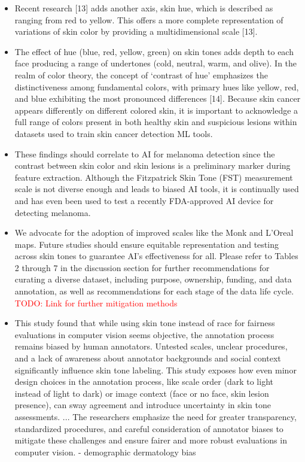 \documentclass[12pt, a4paper, oneside]{book}   	%
\renewcommand{\todo}[1]{\textcolor{red}{TODO: #1}}
\newif\ifrawcitationactive
\newcommand{\rawcitationend}{
	\color{black}\rawcitationactivefalse
}
\begin{document}
\begin{itemize}
			\item Recent research [13] adds another axis, skin hue, which is described as ranging from red to yellow. This offers a more complete representation of variations of skin color by providing a multidimensional scale [13]. \autocite{Montoya_2025}
			\item The effect of hue (blue, red, yellow, green) on skin tones adds depth to each face producing a range of undertones (cold, neutral, warm, and olive). In the realm of color theory, the concept of ‘contrast of hue’ emphasizes the distinctiveness among fundamental colors, with primary hues like yellow, red, and blue exhibiting the most pronounced differences [14]. Because skin cancer appears differently on different colored skin, it is important to acknowledge a full range of colors present in both healthy skin and suspicious lesions within datasets used to train skin cancer detection ML tools. \autocite{Montoya_2025}
			\item These findings should correlate to AI for melanoma detection since the contrast between skin color and skin lesions is a preliminary marker during feature extraction. Although the Fitzpatrick Skin Tone (FST) measurement scale is not diverse enough and leads to biased AI tools, it is continually used and has even been used to test a recently FDA-approved AI device for detecting melanoma. \autocite{Montoya_2025}
			\item We advocate for the adoption of improved scales like the Monk and L’Oreal maps. Future studies should ensure equitable representation and testing across skin tones to guarantee AI’s effectiveness for all. Please refer to Tables 2 through 7 in the discussion section for further recommendations for curating a diverse dataset, including purpose, ownership, funding, and data annotation, as well as recommendations for each stage of the data life cycle. \autocite{Montoya_2025} \todo{Link for further mitigation methods}
			\item This study found that while using skin tone instead of race for fairness evaluations in computer vision seems objective, the annotation process remains biased by human annotators. Untested scales, unclear procedures, and a lack of awareness about annotator backgrounds and social context significantly influence skin tone labeling. This study exposes how even minor design choices in the annotation process, like scale order (dark to light instead of light to dark) or image context (face or no face, skin lesion presence), can sway agreement and introduce uncertainty in skin tone assessments. ... The researchers emphasize the need for greater transparency, standardized procedures, and careful consideration of annotator biases to mitigate these challenges and ensure fairer and more robust evaluations in computer vision. \autocite{Montoya_2025} - demographic dermatology bias
		\end{itemize}
	\rawcitationend
	
\end{document}
